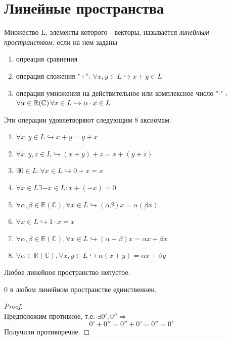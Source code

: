 \section{Линейные пространства}

\begin{definition}
    Множество L, элементы которого - векторы, называется \textit{линейным пространством}, если на нем заданы
    \begin{enumerate}
        \item опреация сравнения
        \item операция сложения "+": $\forall x, y\in L \hookrightarrow x + y\in L$
        \item операция умножения на действительное или комплексное число "$\cdot$" : $\forall\alpha\in\mathbb{R}(\mathbb{C})\thinspace\forall x\in L \hookrightarrow \alpha \cdot x\in L$
    \end{enumerate}
    Эти операции удовлетворяют следующим 8 аксиомам:
    \begin{enumerate}
        \item $\forall x, y \in L \hookrightarrow x + y = y + x$
        \item $\forall x, y, z \in L \hookrightarrow (x + y) + z = x + (y + z)$
        \item $\exists 0 \in L : \forall x \in L \hookrightarrow 0 + x = x$
        \item $\forall x \in L \exists -x \in L : x + (-x) = 0$
        \item $\forall \alpha, \beta \in \mathbb{R} (\mathbb{C}), \forall x \in L \hookrightarrow (\alpha\beta)x = \alpha(\beta x)$
        \item $\forall x \in L \hookrightarrow 1\cdot x = x$
        \item $\forall \alpha, \beta \in \mathbb{R}(\mathbb{C}) , \forall x \in L \hookrightarrow (\alpha + \beta)x = \alpha x + \beta x$
        \item $\forall \alpha \in \mathbb{R}(\mathbb{C}) , \forall x, y \in L \hookrightarrow \alpha(x + y) = \alpha x + \beta y$
    \end{enumerate}
    
\end{definition}
Любое линейное пространство непустое.

\begin{proposition}
  0 в любом линейном пространстве единственнен.  
\end{proposition}
\begin{proof}
\tab\\

    Предположим противное, т.е. $\exists 0', 0'' \Longrightarrow$
    \[
    0' + 0'' = 0'' + 0' = 0'' = 0'
    \]
    Получили противоречие.
\end{proof}

